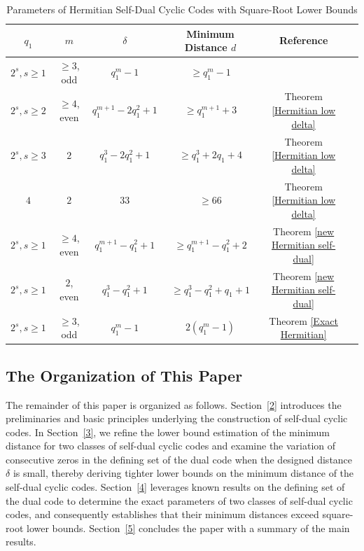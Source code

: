 \documentclass[journal,12pt,onecolumn]{IEEEtran}
\begin{document}
\begin{table}[htbp]
    \centering
    \caption{Parameters of Hermitian Self-Dual Cyclic Codes with Square-Root Lower Bounds }
    \label{Parameters of Hermitian Self-Dual Cyclic Codes}
    \begin{tabular}{c c c c c c}
        \hline
        $q_1$ & $m$ & $\delta$ & Minimum Distance $d$ & Reference \\
        \hline
        $2^s,s\ge1$ & $\ge3$, odd & $q_1^m-1$ & $\ge q_1^m-1$ & \cite{10856234} \\
        $2^s,s\ge2$ & $\ge 4$, even & $q_1^{m+1}-2q_1^2+1$ & $\ge q_1^{m+1}+3$ & Theorem \ref{Hermitian low delta} \\
        $2^s, s\ge 3$ & $2$ & $q_1^3-2q_1^2+1$ & $\ge q_1^3+2q_1+4$ & Theorem \ref{Hermitian low delta} \\
        $4$ & $2$ & $33$ & $\ge 66$ & Theorem \ref{Hermitian low delta} \\
        $2^s,s\ge1$ & $\ge 4$, even & $q_1^{m+1}-q_1^2+1$ & $\ge q_1^{m+1}-q_1^2+2$ & Theorem \ref{new Hermitian self-dual} \\
        $2^s,s\ge1$ & $2$, even & $q_1^3-q_1^2+1$ & $\ge q_1^{3}-q_1^2+q_1+1$ & Theorem \ref{new Hermitian self-dual} \\
        $2^s,s\ge1$ & $\ge3$, odd & $q_1^m-1$ & $2(q_1^m-1)$ & Theorem \ref{Exact Hermitian} \\
        \hline
    \end{tabular}
\end{table}

\subsection{The Organization of This Paper}

The remainder of this paper is organized as follows. Section~\ref{2} introduces the preliminaries and basic principles underlying the construction of self-dual cyclic codes. In Section~\ref{3}, we refine the lower bound estimation of the minimum distance for two classes of self-dual cyclic codes and examine the variation of consecutive zeros in the defining set of the dual code when the designed distance $\delta$ is small, thereby deriving tighter lower bounds on the minimum distance of the self-dual cyclic codes. Section~\ref{4} leverages known results on the defining set of the dual code to determine the exact parameters of two classes of self-dual cyclic codes, and consequently establishes that their minimum distances exceed square-root lower bounds. Section~\ref{5} concludes the paper with a summary of the main results.
\end{document}
